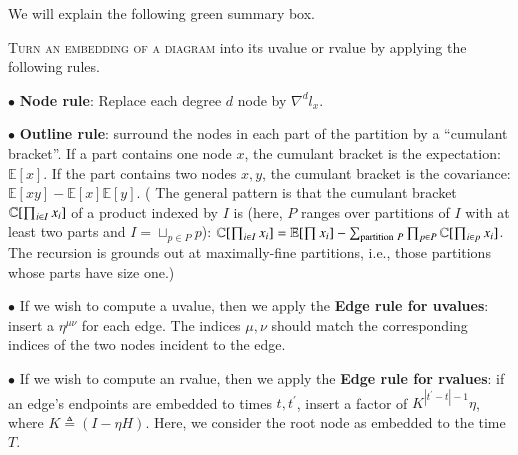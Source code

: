 \documentclass[anon,12pt]{colt2021} %
\newcommand{\translucent}[2]{\colorbox{#1}{#2}}
\newcommand{\wabs}[1]{\left|#1\right|}
\newcommand{\expc}{\mathbb{E}}
\begin{document}
{        We will explain the following green summary box.
        \par
        \noindent
        \translucent{moolime}{\parbox{\textwidth}{
            \textsc{Turn an embedding of a diagram} into its uvalue or rvalue
            by applying the following rules. 
            \par \indent $\bullet$
                \textbf{Node rule}: Replace each degree $d$ node by $\nabla^d
                l_x$.
            \par \indent $\bullet$
                \textbf{Outline rule}: surround the nodes in each part of the
                partition by a ``cumulant bracket''.  If a part contains one
                node $x$, the cumulant bracket is the expectation: $\expc[x]$.
                If the part contains two nodes $x,y$, the cumulant bracket is
                the covariance: $\expc[xy]-\expc[x]\expc[y]$. ({\footnotesize
                    The general pattern is that the cumulant bracket $\mathbb{C}[\prod_{i\in I} x_i]$
                    of a product indexed by $I$ is (here, $P$ ranges over partitions of $I$ with at least 
                    two parts and $I = \sqcup_{p\in P} p$):
                    $
                        \CC[\prod_{i\in I} x_i] = \expc[\prod x_i] - \sum_{\text{partition}~P} \prod_{p\in P} \CC[\prod_{i\in p} x_i]
                    $}.  The recursion is grounds out at maximally-fine partitions, i.e., those partitions
                    whose parts have size one.)
            \par \indent $\bullet$  If we wish to compute a uvalue, then we apply the
                \textbf{Edge rule for uvalues}: insert a $\eta^{\mu\nu}$ for each
                edge.  The indices $\mu, \nu$ should match the corresponding
                indices of the two nodes incident to the edge.
            \par \indent $\bullet$ If we wish to compute an rvalue, then we apply the
                \textbf{Edge rule for rvalues}: if an edge's endpoints are embedded to times
                $t, t^\prime$, insert a factor of $K^{\wabs{t^\prime-t}-1} \eta$,
                where $K \triangleq (I-\eta H)$.  Here, we consider the root node
                as embedded to the time $T$.
        }}

        
}
\end{document}
